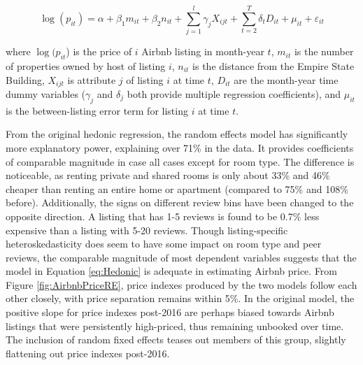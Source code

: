 \documentclass[12pt]{article}
\begin{document}
		\begin{equation}
			\label{eq:HedonicRE}
			\log(p_{it}) = \alpha + \beta_1 m_{it} + \beta_2 n_{it} + \sum_{j=1}^{l}\gamma_j X_{ijt} + \sum_{t=2}^{T}\delta_t D_{it} + \mu_{it} + \varepsilon_{it}
		\end{equation}
		
		\par
		where $\log(p_{it}$) is the price of $i$ Airbnb listing in month-year $t$, $m_{it}$ is the number of properties owned by host of listing $i$, $n_{it}$ is the distance from the Empire State Building, $X_{ijt}$ is attribute $j$ of listing $i$ at time $t$, $D_{it}$ are the month-year time dummy variables ($\gamma_j$ and $\delta_j$ both provide multiple regression coefficients), and $\mu_{it}$ is the between-listing error term for listing $i$ at time $t$.

		\par
		From the original hedonic regression, the random effects model has significantly more explanatory power, explaining over 71\% in the data. It provides coefficients of comparable magnitude in case all cases except for room type. The difference is noticeable, as renting private and shared rooms is only about 33\% and 46\% cheaper than renting an entire home or apartment (compared to 75\% and 108\% before). Additionally, the signs on different review bins have been changed to the opposite direction. A listing that has 1-5 reviews is found to be 0.7\% less expensive than a listing with 5-20 reviews. Though listing-specific heteroskedasticity does seem to have some impact on room type and peer reviews, the comparable magnitude of most dependent variables suggests that the model in Equation \ref{eq:Hedonic} is adequate in estimating Airbnb price. From Figure \ref{fig:AirbnbPriceRE}, price indexes produced by the two models follow each other closely, with price separation remains within 5\%. In the original model, the positive slope for price indexes post-2016 are perhaps biased towards Airbnb listings that were persistently high-priced, thus remaining unbooked over time. The inclusion of random fixed effects teases out members of this group, slightly flattening out price indexes post-2016.
		 
\end{document}
